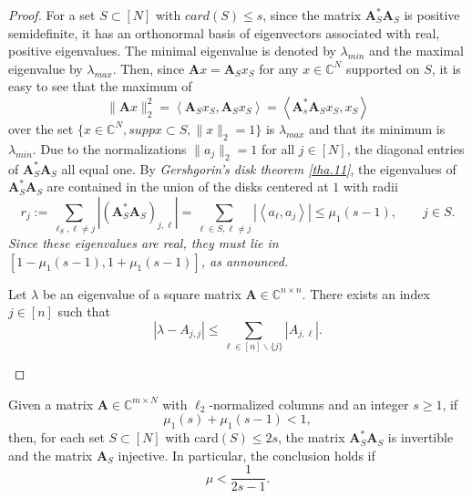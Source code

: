 \begin{proof}
    For a set $S \subset [N]$ with $card(S) \leq s$, since the matrix $\mathbf{A}_{S}^*\mathbf{A}_S$ is positive semidefinite, it has an orthonormal basis of eigenvectors associated with real, positive eigenvalues. The minimal eigenvalue is denoted by $\lambda_{min}$ and the maximal eigenvalue by $\lambda_{max}$. Then, since $\mathbf{A}x = \mathbf{A}_Sx_S$ for any $x \in \mathbb{C}^N$ supported on $S$, it is easy to see that the maximum of 
    \[\|\mathbf{A}x\|_2^2 = \left<\mathbf{A}_Sx_S, \mathbf{A}_S x_S\right> = \left<\mathbf{A}_s^*\mathbf{A}_S x_S, x_S\right>\]
    over the set $\{x \in \mathbb{C}^N, supp x \subset S, \|x\|_2 = 1\}$ is $\lambda_{max}$ and that its minimum is $\lambda_{min}$. Due to the normalizations $\|a_j\|_2=1 $ for all $j \in [N]$, the diagonal entries of $\mathbf{A}_S^* \mathbf{A}_S$ all equal one. By \emph{Gershgorin's disk theorem \cref{tha.11}}, the eigenvalues of $\mathbf{A}_S^* \mathbf{A}_S$ are contained in the union of the disks centered at $1$ with radii
    \[r_j := \sum\limits_{\ell_S,\ell \neq j}\left|(\mathbf{A}_S^*\mathbf{A}_S)_{j,\ell}\right| = \sum\limits_{\ell \in S,\ell \neq j} \left|\left<a_{\ell},a_j\right>\right| \leq \mu_1(s-1), \qquad j\in S.\]
    \emph{\textcolor[rgb]{1,0,0}{Since these eigenvalues are real, they must lie in $\left[1- \mu_1(s-1), 1+\mu_1(s-1)\right]$, as announced.}}

    \begin{theorem}
        Let $\lambda$ be an eigenvalue of a square matrix $\mathbf{A} \in \mathbb{C}^{n \times n}$. There exists an index $j \in [n]$ such that 
        \[|\lambda - A_{j,j}| \leq \sum\limits_{\ell \in [n] \backslash \{j\}} |A_{j,\ell}|.\]
    \label{tha.11}
    \end{theorem}
\end{proof}
\begin{corollary}
    \label{cr1.4}
    Given a matrix $\mathbf{A} \in \mathbb{C}^{m \times N}$ with $\ell_2$-normalized columns and an integer $s \geq 1$, if 
    \[\mu_1(s)+\mu_1(s-1) < 1,\]
    then, for each set $S \subset [N]$ with card$(S) \leq 2s$, the matrix $\mathbf{A}_S^*\mathbf{A}_S$ is invertible and the matrix $\mathbf{A}_S$ injective. In particular, the conclusion holds if 
    \[\mu < \dfrac{1}{2s-1}.\]
\end{corollary}

